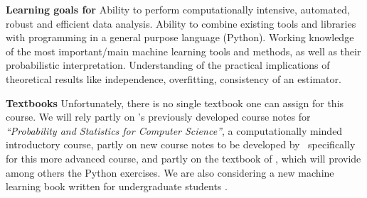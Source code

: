 \item[]{\bf Learning goals for \statcl} Ability to perform computationally intensive, automated, robust and efficient data analysis. Ability to combine existing tools and libraries with programming in a general purpose language (Python). 
Working knowledge of the most important/main machine learning tools and methods, as well as their probabilistic interpretation. Understanding of the practical implications of theoretical results like independence, overfitting, consistency of an estimator. 

{\bf Textbooks} Unfortunately, there is no single textbook one can
assign for this course. We will rely partly on \meila's previously
developed course notes for {\it ``Probability and Statistics for
  Computer Science''}, a computationally minded introductory course,
partly on new course notes to be developed by \meila\ specifically for
this more advanced course, and partly on the textbook of \astrocl, 
which will provide among others the Python exercises. We are also
considering a new machine learning book written for undergraduate
students \cite{x}. 

